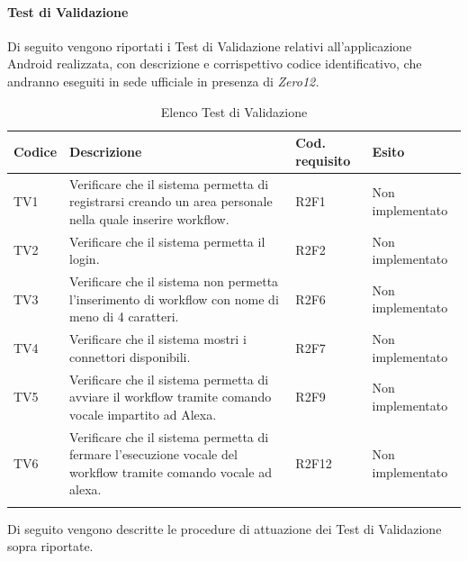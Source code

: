 \paragraph{Test di Validazione}
\label{sec:tvRA}
Di seguito vengono riportati i Test di Validazione relativi all'applicazione Android realizzata, con descrizione e corrispettivo codice identificativo, che andranno eseguiti in sede ufficiale in presenza di \textit{Zero12.}
\begin{center}
	\centering
	\renewcommand{\arraystretch}{1.5}
	\begin{longtable}{  p{1.2cm}  p{8cm} p{1.8cm} p{2.2cm} }
		\rowcolor{tableHeadYellow}
		\textbf{Codice}   & \textbf{Descrizione} & \textbf{Cod. \mbox{requisito}} & \textbf{Esito} \\ 
		\endhead
		TV1 & Verificare che il sistema permetta di registrarsi creando un area personale nella quale inserire workflow. & R2F1 & Non \mbox{implementato} \\
		TV2 & Verificare che il sistema permetta il login. & R2F2 & Non \mbox{implementato} \\
		TV3 & Verificare che il sistema non permetta l’inserimento di workflow con nome di meno di 4 caratteri. & R2F6 & Non \mbox{implementato} \\
		TV4 & Verificare che il sistema mostri i connettori disponibili. & R2F7 & Non \mbox{implementato} \\
		TV5 & Verificare che il sistema permetta di avviare il workflow tramite comando vocale impartito ad Alexa. & R2F9 & Non \mbox{implementato} \\
		TV6 & Verificare che il sistema permetta di fermare l’esecuzione vocale del workflow tramite comando vocale ad alexa. & R2F12 & Non \mbox{implementato} \\
		\rowcolor{white}
		\caption{Elenco Test di Validazione}
	\end{longtable}
\end{center}
Di seguito vengono descritte le procedure di attuazione dei Test di Validazione sopra riportate.
